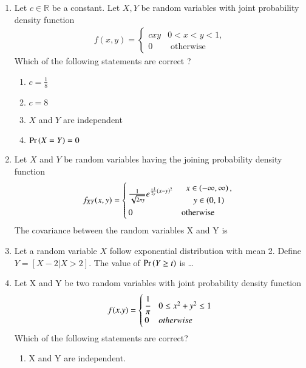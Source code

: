 \renewcommand{\theequation}{\theenumi}
\renewcommand{\thefigure}{\theenumi}
\renewcommand{\thetable}{\theenumi}
\begin{enumerate}[label=\thesection.\arabic*.,ref=\thesection.\theenumi]

\item Let $ c \in \mathbb{R} $ be a constant. Let $ X, Y$ be random variables with joint probability density function 
\begin{align}
f(x,y)  = 
\begin{cases}
cxy &  0<x<y<1,
\\
0 & \text{ otherwise }
\end{cases}
\label{eq:: joint_pdf}
\end{align}
Which of the following statements are correct ?
\begin{enumerate}
    \item $c = \frac{1}{8}$
    \item $ c= 8$
    \item $X $ and $ Y$ are independent
    \item $\Pr\left(X= Y\right) = 0 $
\end{enumerate}
\solution

%
\item Let $X$ and $Y$ be random variables having the joining probability density function
\begin{align}
f_{XY}(x,y)=
\begin{cases}
\frac{1}{\sqrt{2\pi y}}e^{\frac{-1}{2y}(x-y)^2} & 
\begin{array}{c}
x \in \left(-\infty,\infty\right), 
\\
y \in \left(0, 1\right) 
\end{array}
\\
0 &\text{otherwise}
\end{cases}
\label{eq:twoD/2}
\end{align}
The covariance between the random variables X and Y is
\\
%
\solution
%
\item Let a random variable $X$ follow exponential distribution with mean 2. Define $Y=[X-2|X>2]$. The value of $\Pr\left(Y \geq t\right)$ is \dots
\\
%
\solution

%
\item Let X and Y be two random variables with joint probability density function
\begin{align*}
    f(x.y)=
    \begin{cases}
    \cfrac{1}{\pi} & 0\le x^2 + y^2 \le 1\\
    0 & otherwise
    \end{cases}
\end{align*}
Which of the following statements are correct?
\begin{enumerate}
    \item
    X and Y are independent.
    

\end{enumerate}
\end{enumerate}

